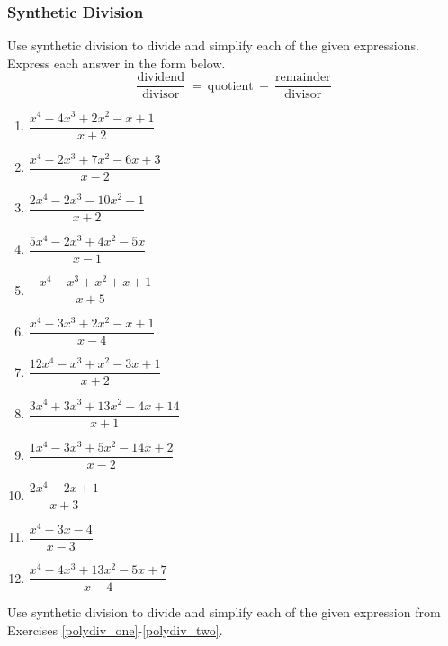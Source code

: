 \documentclass[12pt]{book}
\theoremstyle{definition}
\begin{document}
\subsubsection{Synthetic Division}
Use synthetic division to divide and simplify each of the given expressions.  Express each answer in the form below.
$$\frac{\text{dividend}}{\text{divisor}} \ = \ \text{quotient} \ + \ \frac{\text{remainder}}{\text{divisor}}$$
\begin{multicols}{2}
\begin{enumerate}
  \item $\dfrac{x^4-4x^3+2x^2-x+1 }{x+2}$
  \item $\dfrac{x^4-2x^3+7x^2-6x+3 }{x-2}$
  \item $\dfrac{2x^4-2x^3-10x^2+1 }{x+2}$
  \item $\dfrac{5x^4-2x^3+4x^2-5x }{x-1}$
  \item $\dfrac{-x^4-x^3+x^2+x+1 }{x+5}$
  \item $\dfrac{x^4-3x^3+2x^2-x+1 }{x-4}$
  \item $\dfrac{12x^4-x^3+x^2-3x+1 }{x+2}$
  \item $\dfrac{3x^4+3x^3+13x^2-4x+14 }{x+1}$
  \item $\dfrac{1x^4-3x^3+5x^2-14x+2 }{x-2}$
  \item $\dfrac{2x^4-2x+1 }{x+3}$
  \item $\dfrac{x^4-3x-4 }{x-3}$
  \item $\dfrac{x^4-4x^3+13x^2-5x+7 }{x-4}$
\end{enumerate}
\end{multicols}
Use synthetic division to divide and simplify each of the given expression from Exercises \ref{polydiv_one}-\ref{polydiv_two}.
\end{document}
